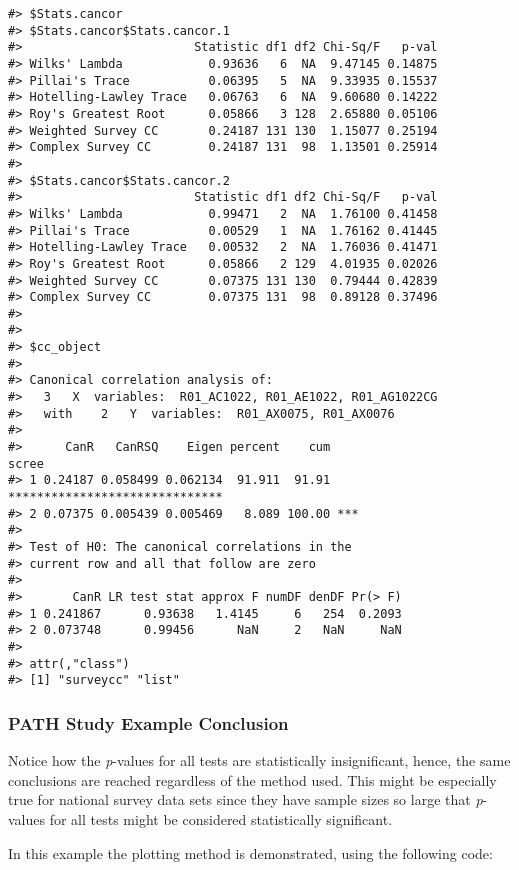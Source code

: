 \begin{verbatim}
#> $Stats.cancor
#> $Stats.cancor$Stats.cancor.1
#>                        Statistic df1 df2 Chi-Sq/F   p-val
#> Wilks' Lambda            0.93636   6  NA  9.47145 0.14875
#> Pillai's Trace           0.06395   5  NA  9.33935 0.15537
#> Hotelling-Lawley Trace   0.06763   6  NA  9.60680 0.14222
#> Roy's Greatest Root      0.05866   3 128  2.65880 0.05106
#> Weighted Survey CC       0.24187 131 130  1.15077 0.25194
#> Complex Survey CC        0.24187 131  98  1.13501 0.25914
#> 
#> $Stats.cancor$Stats.cancor.2
#>                        Statistic df1 df2 Chi-Sq/F   p-val
#> Wilks' Lambda            0.99471   2  NA  1.76100 0.41458
#> Pillai's Trace           0.00529   1  NA  1.76162 0.41445
#> Hotelling-Lawley Trace   0.00532   2  NA  1.76036 0.41471
#> Roy's Greatest Root      0.05866   2 129  4.01935 0.02026
#> Weighted Survey CC       0.07375 131 130  0.79444 0.42839
#> Complex Survey CC        0.07375 131  98  0.89128 0.37496
#> 
#> 
#> $cc_object
#> 
#> Canonical correlation analysis of:
#>   3   X  variables:  R01_AC1022, R01_AE1022, R01_AG1022CG 
#>   with    2   Y  variables:  R01_AX0075, R01_AX0076 
#> 
#>      CanR   CanRSQ    Eigen percent    cum                          scree
#> 1 0.24187 0.058499 0.062134  91.911  91.91 ******************************
#> 2 0.07375 0.005439 0.005469   8.089 100.00 ***                           
#> 
#> Test of H0: The canonical correlations in the 
#> current row and all that follow are zero
#> 
#>       CanR LR test stat approx F numDF denDF Pr(> F)
#> 1 0.241867      0.93638   1.4145     6   254  0.2093
#> 2 0.073748      0.99456      NaN     2   NaN     NaN
#> 
#> attr(,"class")
#> [1] "surveycc" "list"
\end{verbatim}

\hypertarget{path-study-example-conclusion}{%
\subsubsection{PATH Study Example Conclusion}\label{path-study-example-conclusion}}

Notice how the \emph{p}-values for all tests are statistically insignificant, hence, the same conclusions are reached regardless of the method used. This might be especially true for national survey data sets since they have sample sizes so large that \emph{p}-values for all tests might be considered statistically significant.

In this example the plotting method is demonstrated, using the following code:

